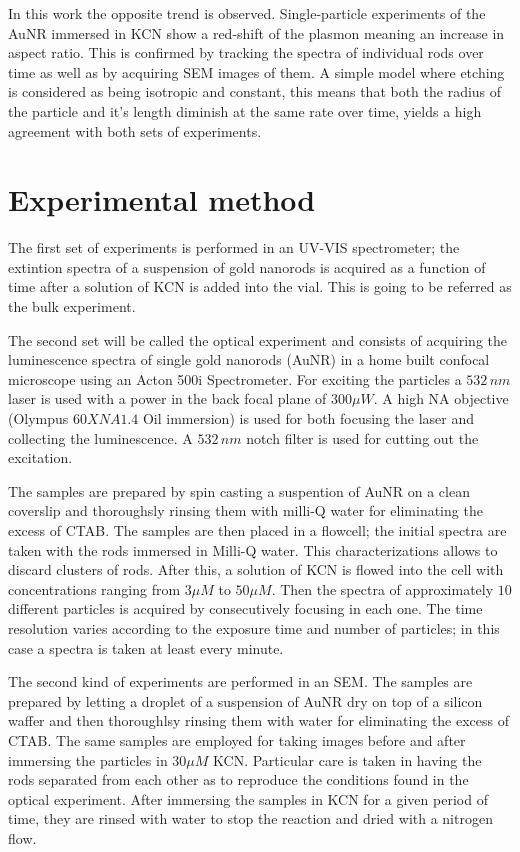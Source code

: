\documentclass[twocolumn]{article}
\begin{document}
In this work the opposite trend is observed. Single-particle experiments of the
AuNR immersed in KCN show a red-shift of the plasmon meaning an increase in
aspect ratio. This is confirmed by tracking the spectra of individual rods over
time as well as by acquiring SEM images of them. A simple model where etching is
considered as being isotropic and constant, this means that both the radius of
the particle and it's length diminish at the same rate over time, yields a high
agreement with both sets of experiments.

\section{Experimental method}
The first set of experiments is performed in an UV-VIS spectrometer; the
extintion spectra of a suspension of gold nanorods is acquired as a function of
time after a solution of KCN is added into the vial. This is going to be
referred as the bulk experiment.

The second set will be called the optical experiment and consists of acquiring
the luminescence spectra of single gold nanorods (AuNR) in a home built confocal
microscope using an Acton 500i Spectrometer. For exciting the particles a
$532\,nm$ laser is used with a power in the back focal plane of $300\mu W$. A
high NA objective (Olympus $60X NA 1.4$ Oil immersion) is used for both focusing the
laser and collecting the luminescence. A $532\,nm$ notch filter is used for
cutting out the excitation.

The samples are prepared by spin casting a suspention of AuNR on a clean
coverslip and thoroughsly rinsing them  with milli-Q water for eliminating the
excess of CTAB. The samples are then placed in a flowcell; the initial spectra
are taken with the rods immersed in Milli-Q water. This characterizations allows
to discard clusters of rods. After this, a solution of KCN is flowed into the cell
with concentrations ranging from $3\mu M$ to $50\mu M$. Then the spectra of
approximately $10$ different particles is acquired by consecutively focusing in
each one. The time resolution varies according to the exposure time and number
of particles; in this case a spectra is taken at least every minute.

The second kind of experiments are performed in an SEM. The samples
are prepared by letting a droplet of a suspension of AuNR dry on top of a
silicon waffer and then thoroughlsy rinsing them with water for eliminating the
excess of CTAB. The same samples are employed for taking images before and after
immersing the particles in $30\mu M$ KCN. Particular care is taken in having the
rods separated from each other as to reproduce the conditions found in the
optical experiment. After immersing the samples in KCN for a given period of
time, they are rinsed with water to stop the reaction and dried with a nitrogen
flow.
\end{document}
